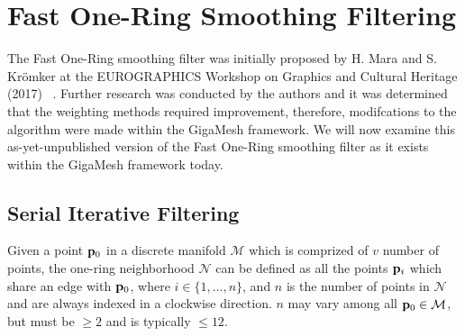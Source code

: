 \chapter{Fast One-Ring Smoothing Filtering}
The Fast One-Ring smoothing filter was initially proposed by H. Mara and S. Krömker at the EUROGRAPHICS Workshop on Graphics and Cultural Heritage (2017) ~\cite[s.~3.2]{Mara17}. Further research was conducted by the authors and it was determined that the weighting methods required improvement, therefore, modifcations to the algorithm were made within the GigaMesh framework. We will now examine this as-yet-unpublished version of the Fast One-Ring smoothing filter as it exists within the GigaMesh framework today.
%
\section{Serial Iterative Filtering}
Given a point $\mathbf{p}_0$ in a discrete manifold $\mathcal{M}$ which is comprized of $v$ number of points, the one-ring neighborhood $\mathcal{N}$ can be defined as all the points $\mathbf{p}_i$ which share an edge with $\mathbf{p}_0$, where $i \in \{1, \ldots, n\}$, and $n$ is the number of points in $\mathcal{N}$ and are always indexed in a clockwise direction. $n$ may vary among all $\mathbf{p}_0 \in \mathcal{M}$, but must be $\geq 2$ and is typically $\leq 12$.%
%
%
%
%
%
%

